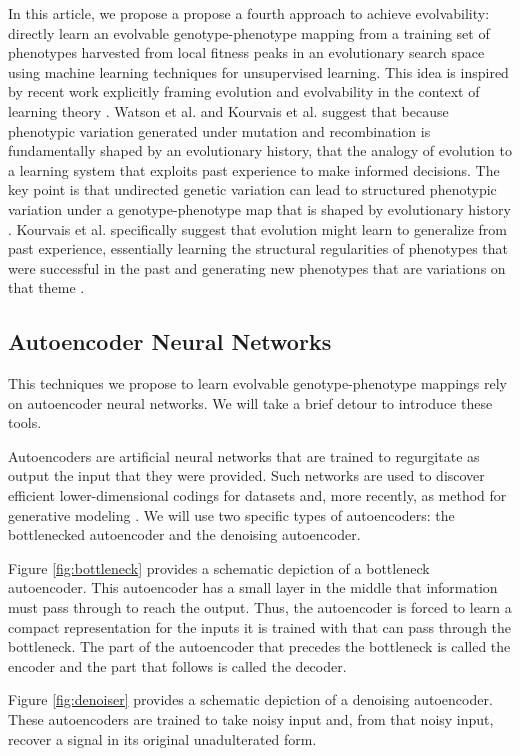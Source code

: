 In this article, we propose a propose a fourth approach to achieve evolvability: directly learn an evolvable genotype-phenotype mapping from a training set of phenotypes harvested from local fitness peaks in an evolutionary search space using machine learning techniques for unsupervised learning.
This idea is inspired by recent work explicitly framing evolution and evolvability in the context of learning theory \cite{kouvaris2017evolution, watson2016can}.
Watson et al. and Kourvais et al. suggest that because phenotypic variation generated under mutation and recombination is fundamentally shaped by an evolutionary history, that the analogy of evolution to a learning system that exploits past experience to make informed decisions.
The key point is that undirected genetic variation can lead to structured phenotypic variation under a genotype-phenotype map that is shaped by evolutionary history \cite{watson2016can}.
Kourvais et al. specifically suggest that evolution might learn to generalize from past experience, essentially learning the structural regularities of phenotypes that were successful in the past and generating new phenotypes that are variations on that theme \cite{kouvaris2017evolution}.

\subsection{Autoencoder Neural Networks}

This techniques we propose to learn evolvable genotype-phenotype mappings rely on autoencoder neural networks.
We will take a brief detour to introduce these tools.

Autoencoders are artificial neural networks that are trained to regurgitate as output the input that they were provided.
Such networks are used to discover efficient lower-dimensional codings for datasets and, more recently, as method for generative modeling \cite{liou2014autoencoder, kingma2013auto}.
We will use two specific types of autoencoders: the bottlenecked autoencoder and the denoising autoencoder.



Figure \ref{fig:bottleneck} provides a schematic depiction of a bottleneck autoencoder.
This autoencoder has a small layer in the middle that information must pass through to reach the output.
Thus, the autoencoder is forced to learn a compact representation for the inputs it is trained with that can pass through the bottleneck.
The part of the autoencoder that precedes the bottleneck is called the encoder and the part that follows is called the decoder.



Figure \ref{fig:denoiser} provides a schematic depiction of a denoising autoencoder.
These autoencoders are trained to take noisy input and, from that noisy input, recover a signal in its original unadulterated form.
